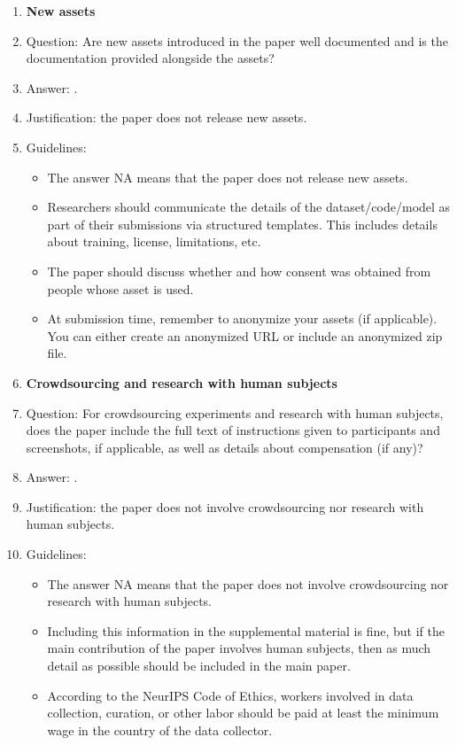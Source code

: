 \documentclass{article}
\theoremstyle{plain}
\theoremstyle{definition}
\theoremstyle{remark}
\begin{document}
\begin{enumerate}
\item {\bf New assets}
    \item[] Question: Are new assets introduced in the paper well documented and is the documentation provided alongside the assets?
    \item[] Answer: \answerNA{}. %
    \item[] Justification: the paper does not release new assets.
    \item[] Guidelines:
    \begin{itemize}
        \item The answer NA means that the paper does not release new assets.
        \item Researchers should communicate the details of the dataset/code/model as part of their submissions via structured templates. This includes details about training, license, limitations, etc. 
        \item The paper should discuss whether and how consent was obtained from people whose asset is used.
        \item At submission time, remember to anonymize your assets (if applicable). You can either create an anonymized URL or include an anonymized zip file.
    \end{itemize}

\item {\bf Crowdsourcing and research with human subjects}
    \item[] Question: For crowdsourcing experiments and research with human subjects, does the paper include the full text of instructions given to participants and screenshots, if applicable, as well as details about compensation (if any)? 
    \item[] Answer: \answerNA{}. %
    \item[] Justification: the paper does not involve crowdsourcing nor research with human subjects.
    \item[] Guidelines:
    \begin{itemize}
        \item The answer NA means that the paper does not involve crowdsourcing nor research with human subjects.
        \item Including this information in the supplemental material is fine, but if the main contribution of the paper involves human subjects, then as much detail as possible should be included in the main paper. 
        \item According to the NeurIPS Code of Ethics, workers involved in data collection, curation, or other labor should be paid at least the minimum wage in the country of the data collector. 
    \end{itemize}


\end{enumerate}
\end{document}
